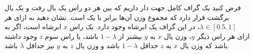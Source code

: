 فرض کنید یک گراف کامل جهت دار داریم که بین هر دو راس یک یال رفت و یک یال برگشت قرار دارد که مجموع وزن آن‌ها برابر با یک است. نشان دهید به ازای هر 
$\lambda \in [0.5, 1]$،
در این گراف یک ابرشاه وجود دارد. یک راس
$x$
ابرشاه است، اگر به ازای هر راس دیگر
$y$،
وزن یال 
$x$
به 
$y$
بیشتر از
$1 - \lambda$
باشد، یا راس سوم
$z$
وجود داشته باشد که وزن یال
$x$
به
$z$
حداقل
$1 - \lambda$
باشد و وزن یال
$z$
به
$y$
نیز حداقل
$\lambda$
باشد.